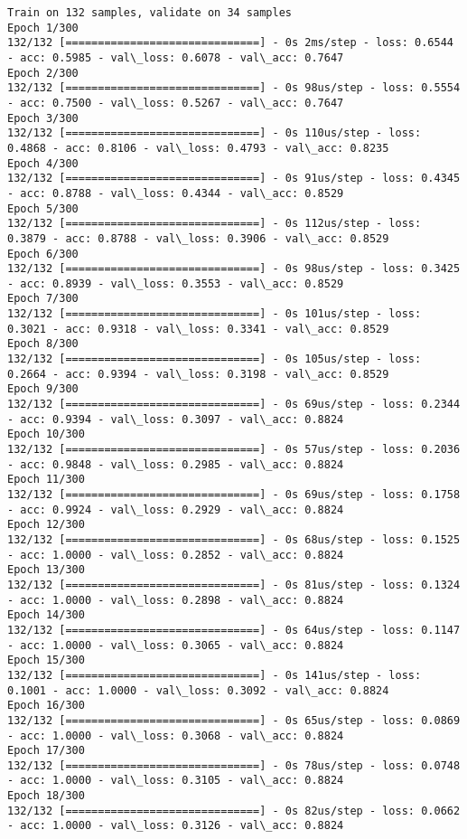 \documentclass[11pt]{article}
\begin{document}
    \begin{Verbatim}[commandchars=\\\{\}]
Train on 132 samples, validate on 34 samples
Epoch 1/300
132/132 [==============================] - 0s 2ms/step - loss: 0.6544 - acc: 0.5985 - val\_loss: 0.6078 - val\_acc: 0.7647
Epoch 2/300
132/132 [==============================] - 0s 98us/step - loss: 0.5554 - acc: 0.7500 - val\_loss: 0.5267 - val\_acc: 0.7647
Epoch 3/300
132/132 [==============================] - 0s 110us/step - loss: 0.4868 - acc: 0.8106 - val\_loss: 0.4793 - val\_acc: 0.8235
Epoch 4/300
132/132 [==============================] - 0s 91us/step - loss: 0.4345 - acc: 0.8788 - val\_loss: 0.4344 - val\_acc: 0.8529
Epoch 5/300
132/132 [==============================] - 0s 112us/step - loss: 0.3879 - acc: 0.8788 - val\_loss: 0.3906 - val\_acc: 0.8529
Epoch 6/300
132/132 [==============================] - 0s 98us/step - loss: 0.3425 - acc: 0.8939 - val\_loss: 0.3553 - val\_acc: 0.8529
Epoch 7/300
132/132 [==============================] - 0s 101us/step - loss: 0.3021 - acc: 0.9318 - val\_loss: 0.3341 - val\_acc: 0.8529
Epoch 8/300
132/132 [==============================] - 0s 105us/step - loss: 0.2664 - acc: 0.9394 - val\_loss: 0.3198 - val\_acc: 0.8529
Epoch 9/300
132/132 [==============================] - 0s 69us/step - loss: 0.2344 - acc: 0.9394 - val\_loss: 0.3097 - val\_acc: 0.8824
Epoch 10/300
132/132 [==============================] - 0s 57us/step - loss: 0.2036 - acc: 0.9848 - val\_loss: 0.2985 - val\_acc: 0.8824
Epoch 11/300
132/132 [==============================] - 0s 69us/step - loss: 0.1758 - acc: 0.9924 - val\_loss: 0.2929 - val\_acc: 0.8824
Epoch 12/300
132/132 [==============================] - 0s 68us/step - loss: 0.1525 - acc: 1.0000 - val\_loss: 0.2852 - val\_acc: 0.8824
Epoch 13/300
132/132 [==============================] - 0s 81us/step - loss: 0.1324 - acc: 1.0000 - val\_loss: 0.2898 - val\_acc: 0.8824
Epoch 14/300
132/132 [==============================] - 0s 64us/step - loss: 0.1147 - acc: 1.0000 - val\_loss: 0.3065 - val\_acc: 0.8824
Epoch 15/300
132/132 [==============================] - 0s 141us/step - loss: 0.1001 - acc: 1.0000 - val\_loss: 0.3092 - val\_acc: 0.8824
Epoch 16/300
132/132 [==============================] - 0s 65us/step - loss: 0.0869 - acc: 1.0000 - val\_loss: 0.3068 - val\_acc: 0.8824
Epoch 17/300
132/132 [==============================] - 0s 78us/step - loss: 0.0748 - acc: 1.0000 - val\_loss: 0.3105 - val\_acc: 0.8824
Epoch 18/300
132/132 [==============================] - 0s 82us/step - loss: 0.0662 - acc: 1.0000 - val\_loss: 0.3126 - val\_acc: 0.8824

\end{Verbatim}
\end{document}
